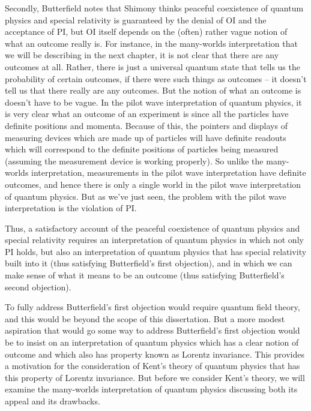 Secondly,  Butterfield notes that Shimony thinks peaceful coexistence of quantum physics and special relativity is guaranteed by the denial of OI and the acceptance of PI, but OI itself depends on the (often) rather vague notion of what an outcome really is. For instance, in the many-worlds interpretation that we will be describing in the next chapter, it is not clear that there are any outcomes at all. Rather, there is just a universal quantum state that tells us the probability of certain outcomes, if there were such things as outcomes -- it doesn't tell us that there really are any outcomes. But the notion of what an outcome is doesn't have to be vague. In the pilot wave interpretation of quantum physics, it is very clear what an outcome of an experiment is since all the particles have definite positions and momenta. Because of this, the pointers and displays of measuring devices which are made up of particles will have definite readouts which will correspond to the definite positions of particles being measured (assuming the measurement device is working properly). So unlike the many-worlds interpretation, measurements in the pilot wave interpretation have definite outcomes, and hence there is only a single world in the pilot wave interpretation of quantum physics. But as we've just seen, the problem with the pilot wave interpretation is the violation of PI.

Thus, a satisfactory account of the peaceful coexistence of quantum physics and special relativity requires an interpretation of quantum physics in which not only PI holds, but also an interpretation of quantum physics that has special relativity built into it (thus satisfying Butterfield's first objection), and in which we can make sense of what it means to be an outcome (thus satisfying Butterfield's second objection). 

To fully address Butterfield's first objection would require quantum field theory, and this would be beyond the scope of this dissertation. But a more modest aspiration that would go some way to address Butterfield's first objection would be to insist on an interpretation of quantum physics which has a clear notion of outcome and which also has property known as Lorentz invariance. This provides a motivation for the consideration of Kent's theory of quantum physics that has this property of Lorentz invariance. But before we consider Kent's theory, we will examine the many-worlds interpretation of quantum physics discussing both its appeal and its drawbacks.
